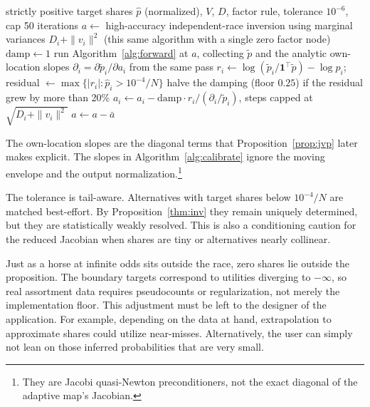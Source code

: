 \documentclass[12pt]{article}
\theoremstyle{remark}
\begin{document}
\begin{algorithm}[H]
\caption{Calibration (damped Jacobi quasi-Newton)}
\label{alg:calibrate}
\begin{algorithmic}[1]
\Require strictly positive target shares $\hat p$ (normalized), $V$, $D$,
factor rule, tolerance $10^{-6}$, cap 50 iterations
\State $a \gets$ high-accuracy independent-race inversion using
marginal variances $D_i + \|v_i\|^2$ (this same algorithm with a
single zero factor node) 
\State $\mathrm{damp} \gets 1$
\Repeat
  \State run Algorithm~\ref{alg:forward} at $a$, collecting $\tilde p$
  and the analytic own-location slopes $\partial_i = \partial \tilde
  p_i / \partial a_i$ from the same pass
  \State $r_i \gets \log(\tilde p_i / \mathbf{1}^\top \tilde p) -
  \log \hat p_i$; residual $\gets \max\{|r_i| : \hat p_i >
  10^{-4}/N\}$
  \State halve the damping (floor $0.25$) if the residual grew by more
  than 20\%
  \State $a_i \gets a_i - \mathrm{damp} \cdot r_i / (\partial_i /
  \tilde p_i)$, steps capped at $\sqrt{D_i + \|v_i\|^2}$
  \State $a \gets a - \bar a$ 
\end{algorithmic}
\end{algorithm}

The own-location slopes are the diagonal terms that
Proposition~\ref{prop:jvp} later makes explicit. The slopes in
Algorithm~\ref{alg:calibrate} ignore the moving envelope and the output
normalization.\footnote{They are Jacobi quasi-Newton preconditioners,
not the exact diagonal of the adaptive map's Jacobian.}

The tolerance is tail-aware. Alternatives with target shares below
$10^{-4}/N$ are matched best-effort. By Proposition~\ref{thm:inv} they
remain uniquely determined, but they are statistically weakly resolved.
This is also a conditioning caution for the reduced Jacobian when shares
are tiny or alternatives nearly collinear.

Just as a horse at infinite odds sits outside the race, zero shares lie outside the proposition. The boundary targets
correspond to utilities diverging to $-\infty$, so real assortment data
requires pseudocounts or regularization, not merely the implementation
floor. This adjustment must be left to the designer of the application. For example, depending
on the data at hand, extrapolation to approximate shares could utilize near-misses. Alternatively, the user can
simply not lean on those inferred probabilities that are very small. 
\end{document}
